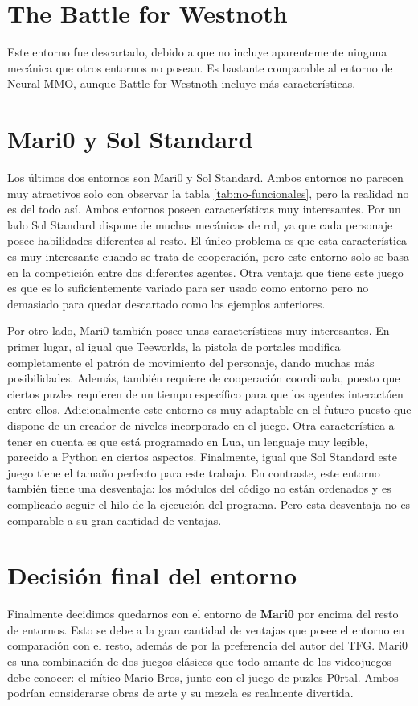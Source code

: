 \section{The Battle for Westnoth}

Este entorno fue descartado, debido a que no incluye aparentemente ninguna mecánica que otros entornos no posean. Es bastante comparable al entorno de Neural MMO, aunque Battle for  Westnoth incluye más características.

\section{Mari0 y Sol Standard}

Los últimos dos entornos son Mari0 y Sol Standard. Ambos entornos no parecen muy atractivos solo con observar la tabla \ref{tab:no-funcionales}, pero la realidad no es del todo así. Ambos entornos poseen características muy interesantes. Por un lado Sol Standard dispone de muchas mecánicas de rol, ya que cada personaje posee habilidades diferentes al resto. El único problema es que esta característica es muy interesante cuando se trata de cooperación, pero este entorno solo se basa en la competición entre dos diferentes agentes. Otra ventaja que tiene este juego es que es lo suficientemente variado para ser usado como entorno pero no demasiado para quedar descartado como los ejemplos anteriores.  

Por otro lado, Mari0 también posee unas características muy interesantes. En primer lugar, al igual que Teeworlds, la pistola de portales modifica completamente el patrón de movimiento del personaje, dando muchas más posibilidades. Además, también requiere de cooperación coordinada, puesto que ciertos puzles requieren de un tiempo específico para que los agentes interactúen entre ellos. Adicionalmente este entorno es muy adaptable en el futuro puesto que dispone de un creador de niveles incorporado en el juego. Otra característica a tener en cuenta es que está programado en Lua, un lenguaje muy legible, parecido a Python en ciertos aspectos. Finalmente, igual que Sol Standard este juego tiene el tamaño perfecto para este trabajo. En contraste, este entorno también tiene una desventaja: los módulos del código no están ordenados y es complicado seguir el hilo de la ejecución del programa. Pero esta desventaja no es comparable a su gran cantidad de ventajas.

\section{Decisión final del entorno}

Finalmente decidimos quedarnos con el entorno de \textbf{Mari0} por encima del resto de entornos. Esto se debe a la gran cantidad de ventajas que posee el entorno en comparación con el resto, además de por la preferencia del autor del TFG. Mari0 es una combinación de dos juegos clásicos que todo amante de los videojuegos debe conocer: el mítico Mario Bros, junto con el juego de puzles P0rtal. Ambos podrían considerarse obras de arte y su mezcla es realmente divertida.

